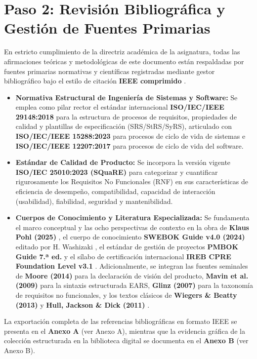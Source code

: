 \section{Paso 2: Revisión Bibliográfica y Gestión de Fuentes Primarias}
En estricto cumplimiento de la directriz académica de la asignatura, todas las afirmaciones teóricas y metodológicas de este documento están respaldadas por fuentes primarias normativas y científicas registradas mediante gestor bibliográfico bajo el estilo de citación \textbf{IEEE comprimido} \cite{ieee29148, pohl2025, swebok2024}.
\begin{itemize}
	\item \textbf{Normativa Estructural de Ingeniería de Sistemas y Software:} Se emplea como pilar rector el estándar internacional \textbf{ISO/IEC/IEEE 29148:2018} \cite{ieee29148} para la estructura de procesos de requisitos, propiedades de calidad y plantillas de especificación (SRS/StRS/SyRS), articulado con \textbf{ISO/IEC/IEEE 15288:2023} \cite{ieee15288} para procesos de ciclo de vida de sistemas e \textbf{ISO/IEC/IEEE 12207:2017} \cite{ieee12207} para procesos de ciclo de vida del software.
	\item \textbf{Estándar de Calidad de Producto:} Se incorpora la versión vigente \textbf{ISO/IEC 25010:2023 (SQuaRE)} \cite{iso25010} para categorizar y cuantificar rigurosamente los Requisitos No Funcionales (RNF) en sus características de eficiencia de desempeño, compatibilidad, capacidad de interacción (usabilidad), fiabilidad, seguridad y mantenibilidad.
	\item \textbf{Cuerpos de Conocimiento y Literatura Especializada:} Se fundamenta el marco conceptual y las ocho perspectivas de contexto en la obra de \textbf{Klaus Pohl (2025)} \cite{pohl2025}, el cuerpo de conocimiento \textbf{SWEBOK Guide v4.0 (2024)} editado por H. Washizaki \cite{swebok2024}, el estándar de gestión de proyectos \textbf{PMBOK Guide 7.ª ed.} \cite{pmbok} y el sílabo de certificación internacional \textbf{IREB CPRE Foundation Level v3.1} \cite{ireb2023}. Adicionalmente, se integran las fuentes seminales de \textbf{Moore (2014)} \cite{moore2014} para la declaración de visión del producto, \textbf{Mavin et al. (2009)} \cite{mavin2009ears} para la sintaxis estructurada EARS, \textbf{Glinz (2007)} \cite{glinz2007nfr} para la taxonomía de requisitos no funcionales, y los textos clásicos de \textbf{Wiegers \& Beatty (2013)} \cite{wiegers2013} y \textbf{Hull, Jackson \& Dick (2011)} \cite{hull2011}.
\end{itemize}
La exportación completa de las referencias bibliográficas en formato IEEE se presenta en el \textbf{Anexo A} (ver Anexo A), mientras que la evidencia gráfica de la colección estructurada en la biblioteca digital se documenta en el \textbf{Anexo B} (ver Anexo B).
